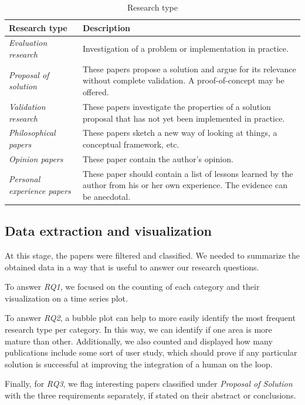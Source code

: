 \begin{table}[hptb]
  \small
  \begin{tabularx}{\textwidth}{l >{\raggedright\arraybackslash}X}
    \hline
    \textbf{Research type} & \textbf{Description} \\
    \hline
    \textit{Evaluation research} & Investigation of a problem or implementation in practice. \\
    \textit{Proposal of solution} & These papers propose a solution and argue for its relevance without
      complete validation. A proof-of-concept may be offered. \\
    \textit{Validation research} & These papers investigate the properties of a solution proposal that
      has not yet been implemented in practice. \\
    \textit{Philosophical papers} & These papers sketch a new way of looking at things, a conceptual
      framework, etc. \\
    \textit{Opinion papers} & These paper contain the author's opinion. \\
    \textit{Personal experience papers} & These paper should contain a list of lessons learned by the
      author from his or her own experience. The evidence can be anecdotal. \\
  \end{tabularx}
  \caption{Research type}\label{tab:mapping/research_type}
\end{table}

\subsection{Data extraction and visualization}
At this stage, the papers were filtered and classified. We needed to summarize
the obtained data in a way that is useful to answer our research questions.

To answer \emph{RQ1}, we focused on the counting of each category
and their visualization on a time series plot.

To answer \emph{RQ2}, a bubble plot can help to more easily identify
the most frequent research type per category. In this way, we can identify if
one area is more mature than other. Additionally, we also counted and displayed
how many publications include some sort of user study, which should prove
if any particular solution is successful at improving the integration of a
human on the loop.

Finally, for \emph{RQ3}, we flag interesting papers classified under
\emph{Proposal of Solution} with the three requirements separately, if stated
on their abstract or conclusions.

